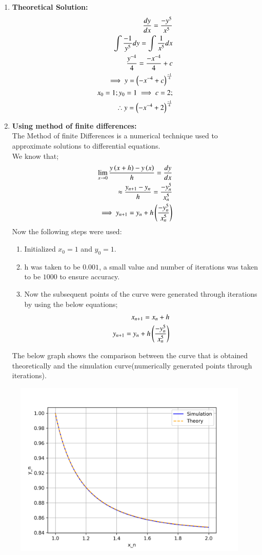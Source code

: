 \documentclass[journal]{IEEEtran}
\begin{document}
\begin{enumerate}
    \item \textbf{Theoretical Solution:}\\ 
    \begin{align}
    \frac{dy}{dx}=\frac{-y^5}{x^5}\\
    \int\frac{-1}{y^5} dy=\int\frac{1}{x^5} dx\\
    \frac{y^{-4}}{4}=\frac{-x^{-4}}{4}+c\\
    \implies y=\left(-x^{-4}+c\right)^{\frac{-1}{4}}\\
     x_0=1; y_0=1\implies c=2;\\
     \therefore y=\left(-x^{-4}+2\right)^{\frac{-1}{4}}
    \end{align}
    \item \textbf{Using method of finite differences:}\\The Method of finite Differences is a numerical technique used to approximate solutions to differential equations.\\
    We know that;\\
    \begin{align}
        \lim_{x\to 0}\frac{y\left(x+h\right)-y\left(x\right)}{h}=\frac{dy}{dx}\\
        \approx \frac{y_{n+1}-y_n}{h}=\frac{-y_n^5}{x_n^5}\\
        \implies y_{n+1}=y_n+h\left(\frac{-y_n^5}{x_n^5}\right)
    \end{align}
    Now the following steps were used:
    \begin{enumerate}
        \item Initialized $x_0=1$ and $y_0=1$.
        \item h was taken to be $0.001$, a small value and number of iterations was taken to be $1000$ to ensure accuracy.
        \item Now the subsequent points of the curve were generated through iterations by using the below equations;
        \begin{align}
            x_{n+1}=x_n+h\\
            y_{n+1}=y_n+h\left(\frac{-y_n^5}{x_n^5}\right)
        \end{align}
    \end{enumerate}
    The below graph shows the comparison between the curve that is obtained theoretically and the simulation curve(numerically generated points through iterations).
\end{enumerate}
\begin{figure}[htbp]
  \centering
  \includegraphics[width=\columnwidth]{figs/curve.png}
\end{figure}
\end{document}
